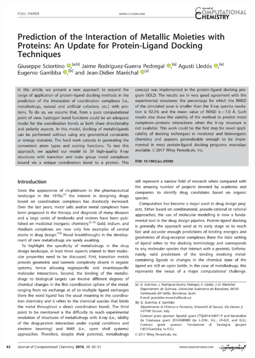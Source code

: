 \includegraphics[width=\textwidth]{figures/pubs/hbondtrick.pdf}
\clearpage\thispagestyle{empty}\mbox{}\clearpage
